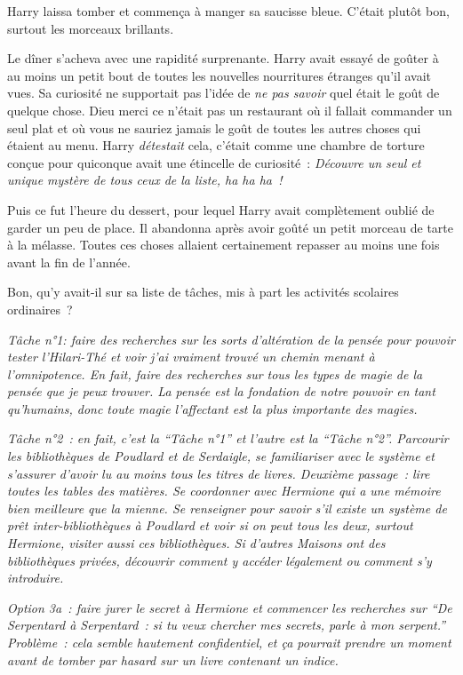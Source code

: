 Harry laissa tomber et commença à manger sa saucisse bleue.
C'était plutôt bon, surtout les morceaux brillants.

Le dîner s'acheva avec une rapidité surprenante.
Harry avait essayé de goûter à au moins un petit bout de toutes les nouvelles nourritures étranges qu'il avait vues.
Sa curiosité ne supportait pas l'idée de \emph{ne pas savoir} quel était le goût de quelque chose.
Dieu merci ce n'était pas un restaurant où il fallait commander un seul plat et où vous ne sauriez jamais le goût de toutes les autres choses qui étaient au menu.
Harry \emph{détestait} cela, c'était comme une chambre de torture conçue pour quiconque avait une étincelle de curiosité~: \emph{Découvre un seul et unique mystère de tous ceux de la liste, ha ha ha~!}

Puis ce fut l'heure du dessert, pour lequel Harry avait complètement oublié de garder un peu de place.
Il abandonna après avoir goûté un petit morceau de tarte à la mélasse.
Toutes ces choses allaient certainement repasser au moins une fois avant la fin de l'année.

Bon, qu'y avait-il sur sa liste de tâches, mis à part les activités scolaires ordinaires~?

\emph{Tâche n°1: faire des recherches sur les sorts d'altération de la pensée pour pouvoir tester l'Hilari-Thé et voir j'ai vraiment trouvé un chemin menant à l'omnipotence.
En fait, faire des recherches sur tous les types de magie de la pensée que je peux trouver.
La pensée est la fondation de notre pouvoir en tant qu'humains, donc toute magie l'affectant est la plus importante des magies.}

\emph{Tâche n°2~: en fait, c'est la “Tâche n°1” et l'autre est la “Tâche n°2”.
Parcourir les bibliothèques de Poudlard et de Serdaigle, se familiariser avec le système et s'assurer d'avoir lu au moins tous les titres de livres.
Deuxième passage~: lire toutes les tables des matières.
Se coordonner avec Hermione qui a une mémoire bien meilleure que la mienne.
Se renseigner pour savoir s'il existe un système de prêt inter-bibliothèques à Poudlard et voir si on peut tous les deux, surtout Hermione, visiter aussi ces bibliothèques.
Si d'autres Maisons ont des bibliothèques privées, découvrir comment y accéder légalement ou comment s'y introduire.}

\emph{Option 3a~: faire jurer le secret à Hermione et commencer les recherches sur “De Serpentard à Serpentard~: si tu veux chercher mes secrets, parle à mon serpent.”
Problème~: cela semble hautement confidentiel, et ça pourrait prendre un moment avant de tomber par hasard sur un livre contenant un indice.}

